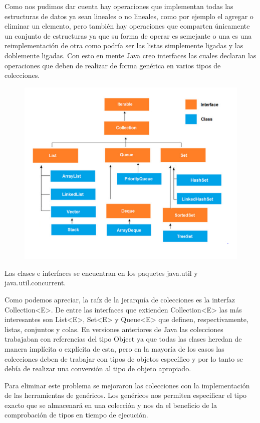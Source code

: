 \documentclass[12pt,a4paper]{report}
\begin{document}
{Como nos pudimos dar cuenta hay operaciones que implementan todas las estructuras de datos ya sean lineales o no lineales, como por ejemplo el agregar o eliminar un elemento, pero también hay operaciones que comparten únicamente un conjunto de estructuras ya que su forma de operar es semejante o una es una reimplementación de otra como podría ser las listas simplemente ligadas y las doblemente ligadas. Con esto en mente Java creo interfaces las cuales declaran las operaciones que deben de realizar de forma genérica en varios tipos de colecciones.
\begin{figure}[hbtp]
\centering
\includegraphics[scale=0.5]{colecciones.PNG}
\end{figure}

Las clases e interfaces  se encuentran en los paquetes java.util y java.util.concurrent.

Como podemos apreciar, la raíz de la jerarquía de colecciones es la interfaz Collection<E>. De entre las interfaces que extienden Collection<E> las más interesantes son List<E>, Set<E> y Queue<E> que definen, respectivamente, listas, conjuntos y colas. En versiones anteriores de Java las colecciones trabajaban con referencias del tipo Object ya que todas las clases heredan de manera implícita o explícita de esta, pero en la mayoría de los casos las colecciones deben de trabajar con tipos de objetos específico y por lo tanto se debía de realizar una conversión al tipo de objeto apropiado.

Para eliminar este problema se mejoraron las colecciones con la implementación de las herramientas de genéricos. Los genéricos nos permiten especificar el tipo exacto que se almacenará en una colección y nos da el  beneficio de la comprobación de tipos en tiempo de ejecución.   
  
}
\end{document}
